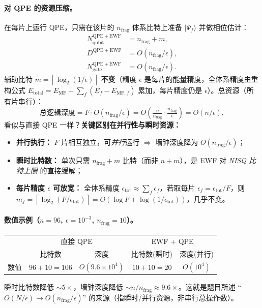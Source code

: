 \documentclass[11pt]{article}
\newcommand{\eps}{\epsilon}
\newcommand{\Oof}[1]{O(#1)}
\newcommand{\ceil}[1]{\left\lceil #1 \right\rceil}
\begin{document}
\paragraph{对 QPE 的资源压缩。} 在每片上运行 QPE，只需在该片的 $n_{\mathrm{frag}}$ 体系比特上准备 $|\Psi_f\rangle$ 并做相位估计：
\begin{align}
  N_{\text{qubit}}^{\mathrm{QPE+EWF}} &= n_{\mathrm{frag}} + m ,\\
  D^{\mathrm{QPE+EWF}} &= \Oof{n_{\mathrm{frag}}/\eps},\\
  N_{\mathrm{gate}}^{\mathrm{QPE+EWF}} &= \Oof{n_{\mathrm{frag}}/\eps}.
\end{align}
辅助比特 $m=\ceil{\log_2(1/\eps)}$ \textbf{不变}（精度 $\eps$ 是每片的能量精度，全体系精度由重构公式 $E_{\mathrm{total}}=E_{\mathrm{MF}}+\sum_f(E_f-E_{\mathrm{MF},f})$ 累加，每片精度仍是 $\eps$）。总资源（所有片串行）：
\begin{equation}
  \text{总逻辑深度} = F\cdot\Oof{n_{\mathrm{frag}}/\eps} = \Oof{\tfrac{n}{n_{\mathrm{frag}}}\cdot\tfrac{n_{\mathrm{frag}}}{\eps}} = \Oof{n/\eps},
\end{equation}
看似与直接 QPE 一样？\textbf{关键区别在并行性与瞬时资源：}
\begin{itemize}
  \item \textbf{并行执行：} $F$ 片相互独立，可\emph{并行}运行 $\Rightarrow$ 墙钟深度降为 $\Oof{n_{\mathrm{frag}}/\eps}$；
  \item \textbf{瞬时比特数：} 单次只需 $n_{\mathrm{frag}}+m$ 比特（而非 $n+m$），是 EWF 对 \emph{NISQ 比特上限} 的直接缓解；
  \item \textbf{每片精度 $\eps$ 可放宽：} 全体系精度 $\eps_{\mathrm{tot}}\approx\sum_f\eps_f$，若取每片 $\eps_f=\eps_{\mathrm{tot}}/F$，则 $m_f=\ceil{\log_2(F/\eps_{\mathrm{tot}})}=\Oof{\log F+\log(1/\eps_{\mathrm{tot}})}$，几乎不变。
\end{itemize}

\paragraph{数值示例（$n=96$, $\eps=10^{-3}$, $n_{\mathrm{frag}}=10$）。}
\begin{center}
\begin{tabular}{l|cc|cc}
\hline
& \multicolumn{2}{c|}{直接 QPE} & \multicolumn{2}{c}{EWF + QPE} \\
& 比特数 & 深度 & 比特数(瞬时) & 深度(并行) \\
\hline
数值 & $96+10=106$ & $\Oof{9.6\times 10^4}$ & $10+10=20$ & $\Oof{10^4}$ \\
\hline
\end{tabular}
\end{center}
瞬时比特数降低 $\sim 5\times$，墙钟深度降低 $\sim n/n_{\mathrm{frag}}\approx 9.6\times$。这就是题目所述 ``$O(N/\eps)\to O(n_{\mathrm{frag}}/\eps)$'' 的来源（指瞬时/并行资源，非串行总操作数）。
\end{document}
